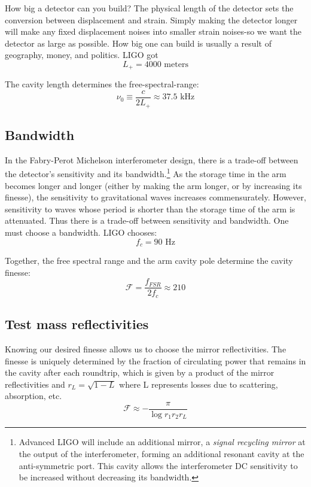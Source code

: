 How big a detector can you build? The physical length of the detector
sets the conversion between displacement and strain. Simply making the
detector longer will make any fixed displacement noises into smaller
strain noises-so we want the detector as large as possible. How big
one can build is usually a result of geography, money, and politics.
LIGO got
%
\begin{equation}
\boxed{{L_{+}=4000\text{{\ meters}}}}
\end{equation}

The cavity length determines the free-spectral-range:
%
\begin{equation}
\nu_0\equiv\frac{c}{2L_{+}}\approx37.5\text{ kHz}
\end{equation}

\subsection*{Bandwidth}

In the Fabry-Perot Michelson interferometer design, there is a trade-off
between the detector's sensitivity and its bandwidth.\footnote{Advanced LIGO will include an additional mirror, a \emph{signal recycling mirror} at the output of the interferometer, forming an additional resonant cavity at the anti-symmetric port.  This cavity allows the interferometer DC sensitivity to be increased without decreasing its bandwidth.}  As the storage
time in the arm becomes longer and longer (either by making the arm
longer, or by increasing its finesse), the sensitivity to gravitational
waves increases commensurately. However, sensitivity to waves whose
period is shorter than the storage time of the arm is attenuated.
Thus there is a trade-off between sensitivity and bandwidth. 
One must choose a bandwidth. LIGO chooses:
%
\begin{equation}
f_{c}=90\text{\ Hz}
\end{equation}

Together, the free spectral range and the arm cavity pole determine
the cavity finesse:
\begin{equation}
\mathcal{F}=\frac{f_{FSR}}{2f_{c}}\approx210
\end{equation}

\subsection*{Test mass reflectivities}

Knowing our desired finesse allows us to choose the mirror reflectivities.
The finesse is uniquely determined by the fraction of circulating
power that remains in the cavity after each roundtrip, which is given
by a product of the mirror reflectivities and $r_{L}=\sqrt{1-L}$
where L represents losses due to scattering, absorption, etc. 
\begin{equation}
\mathcal{F}\approx-\frac{\pi}{\log r_{1}r_{2}r_{L}}
\end{equation}

